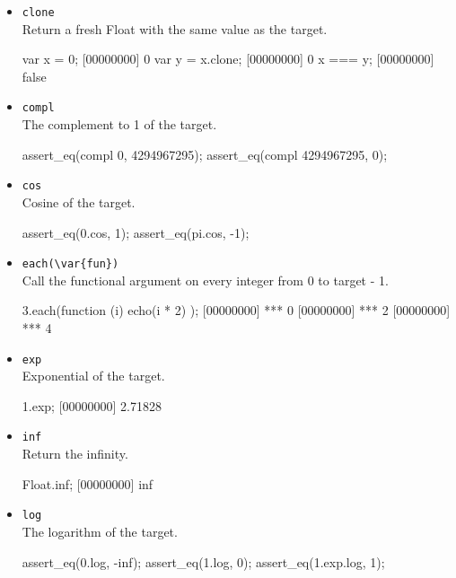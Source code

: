 \begin{itemize}
\item \lstinline|clone|\\
  Return a fresh Float with the same value as the target.
\begin{urbiscript}[firstnumber=last]
var x = 0;
[00000000] 0
var y = x.clone;
[00000000] 0
x === y;
[00000000] false
\end{urbiscript}

\item \lstinline|compl|\\
  The complement to 1 of the target.
\begin{urbiscript}[firstnumber=last]
assert_eq(compl 0, 4294967295);
assert_eq(compl 4294967295, 0);
\end{urbiscript}

\item \lstinline|cos|\\
  Cosine of the target.
\begin{urbiscript}[firstnumber=last]
assert_eq(0.cos, 1);
assert_eq(pi.cos, -1);
\end{urbiscript}

\item \lstinline|each(\var{fun})|\\
  Call the functional argument  on every integer from 0 to
  target - 1.
\begin{urbiscript}[firstnumber=last]
3.each(function (i) { echo(i * 2) });
[00000000] *** 0
[00000000] *** 2
[00000000] *** 4
\end{urbiscript}

\item \lstinline|exp|\\
  Exponential of the target.
\begin{urbiscript}[firstnumber=last]
1.exp;
[00000000] 2.71828
\end{urbiscript}

\item \lstinline|inf|\\
  Return the infinity.
\begin{urbiscript}[firstnumber=last]
Float.inf;
[00000000] inf
\end{urbiscript}

\item \lstinline|log|\\
  The logarithm of the target.
\begin{urbiscript}[firstnumber=last]
assert_eq(0.log, -inf);
assert_eq(1.log, 0);
assert_eq(1.exp.log, 1);
\end{urbiscript}


\end{itemize}
